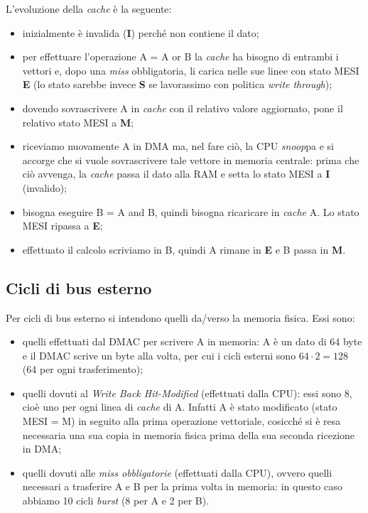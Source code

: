 L'evoluzione della \textit{cache} è la seguente:
\begin{itemize}
\item inizialmente è invalida (\textbf{I}) perché non contiene il dato;
\item per effettuare l'operazione A = A or B la \textit{cache} ha bisogno di entrambi i vettori e, dopo una \textit{miss} obbligatoria, li carica nelle sue linee con stato MESI \textbf{E} (lo stato sarebbe invece \textbf{S} se lavorassimo con politica \textit{write through});
\item dovendo sovrascrivere A in \textit{cache} con il relativo valore aggiornato, pone il relativo stato MESI a \textbf{M};
\item riceviamo nuovamente A in DMA ma, nel fare ciò, la CPU \textit{snoop}pa e si accorge che si vuole sovrascrivere tale vettore in memoria centrale: prima che ciò avvenga, la \textit{cache} passa il dato alla RAM e setta lo stato MESI a \textbf{I} (invalido);
\item bisogna eseguire B = A and B, quindi bisogna ricaricare in \textit{cache} A. Lo stato MESI ripassa a \textbf{E};
\item effettuato il calcolo scriviamo in B, quindi A rimane in \textbf{E} e B passa in \textbf{M}.
\end{itemize}

\subsection{Cicli di bus esterno}

Per cicli di bus esterno si intendono quelli da/verso la memoria fisica.
Essi sono:
\begin{itemize}
\item quelli effettuati dal DMAC per scrivere A in memoria: A è un dato di 64 byte e il DMAC scrive un byte alla volta, per cui i cicli esterni sono $64\cdot 2 = 128$ (64 per ogni trasferimento);
\item quelli dovuti al \textit{Write Back Hit-Modified} (effettuati dalla CPU): essi sono 8, cioè uno per ogni linea di \textit{cache} di A. Infatti A è stato modificato (stato MESI = M) in seguito alla prima operazione vettoriale, cosicché si è resa necessaria una sua copia in memoria fisica prima della sua seconda ricezione in DMA;
\item quelli dovuti alle \textit{miss obbligatorie} (effettuati dalla CPU), ovvero quelli necessari a trasferire A e B per la prima volta in memoria: in questo caso abbiamo 10 cicli \textit{burst} (8 per A e 2 per B).
\end{itemize}

